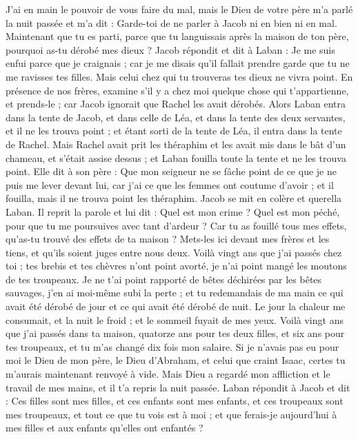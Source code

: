 \begin{multicols}{2}
J'ai en main le pouvoir de vous faire du mal, mais le Dieu de votre père m'a parlé la nuit passée et m'a dit : Garde-toi de ne parler à Jacob ni en bien ni en mal.
Maintenant que tu es parti, parce que tu  languissais après la maison de ton père, pourquoi as-tu dérobé mes dieux ?
Jacob répondit et dit à Laban : Je me suis enfui parce que je craignais ; car je me disais qu'il fallait prendre garde que tu ne me ravisses tes filles.
Mais celui chez qui tu trouveras tes dieux ne vivra point. En présence de nos frères, examine  s'il y a chez moi quelque chose qui t'appartienne, et prends-le ; car Jacob ignorait que Rachel les avait dérobés.
Alors Laban entra dans la tente de Jacob, et dans celle de Léa, et dans la tente des deux servantes, et il ne les trouva point ; et étant sorti de la tente de Léa, il entra dans la tente de Rachel.
Mais Rachel avait prit les théraphim et les avait mis dans le bât d'un chameau, et s’était assise dessus ; et Laban fouilla toute la tente et ne les trouva point.
Elle dit à son père : Que mon seigneur ne se fâche point de ce que je ne puis me lever devant lui, car j'ai ce que les femmes ont coutume d'avoir ; et il fouilla, mais il ne trouva point les théraphim.
Jacob se mit en colère et querella Laban. Il reprit la parole et lui dit : Quel est mon crime ? Quel est mon péché, pour que tu me poursuives avec tant d’ardeur ?
Car tu as fouillé tous mes effets, qu'as-tu trouvé des effets de ta maison ? Mets-les ici devant mes frères et les tiens, et qu'ils soient juges entre nous deux.
Voilà vingt ans que j’ai passés chez toi ; tes brebis et tes chèvres n'ont point avorté, je n'ai point mangé les moutons de tes troupeaux.
Je ne t'ai point rapporté de bêtes déchirées par les bêtes sauvages, j'en ai moi-même subi la perte ; et tu redemandais de ma main ce qui avait été dérobé de jour et ce qui avait été dérobé de nuit.
Le jour la chaleur me consumait, et la nuit le froid ; et le sommeil fuyait de mes yeux.
Voilà vingt ans que j’ai passés dans ta maison, quatorze ans pour tes deux filles, et six ans pour tes troupeaux, et tu m'as changé dix fois mon salaire.
Si je n’avais pas eu pour moi le Dieu de mon père, le Dieu d'Abraham, et celui que craint Isaac, certes tu m’aurais maintenant renvoyé à vide. Mais Dieu a regardé mon affliction et le travail de mes mains, et il t'a repris la nuit passée.
Laban répondit à Jacob et dit : Ces filles sont mes filles, et ces enfants sont mes enfants, et ces troupeaux sont mes troupeaux, et tout ce que tu vois est à moi ; et que ferais-je aujourd'hui à mes filles et aux enfants qu'elles ont enfantés ?

\end{multicols}
